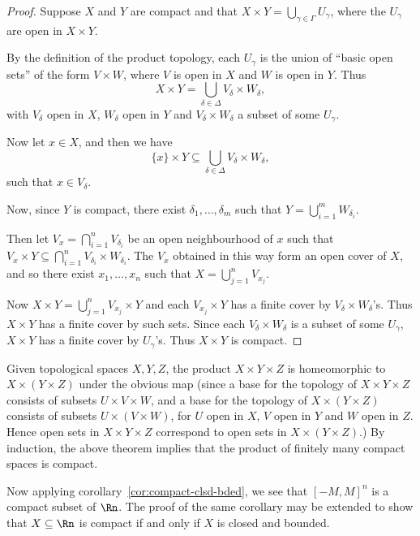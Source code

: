 \begin{proof}
	Suppose $X$ and $Y$ are compact and that $X\times Y=\bigcup_{\gamma\in\Gamma} U_\gamma$, where the $U_\gamma$ are open in $X\times Y$.

	By the definition of the product topology, each $U_\gamma$ is the union of ``basic open sets'' of the form $V \times W$, where $V$ is open in $X$ and $W$ is open in $Y$. Thus
	\begin{equation*}
		X\times Y=\bigcup_{\delta\in\Delta} V_\delta \times W_\delta,
	\end{equation*}
	with $V_\delta$ open in $X$, $W_\delta$ open in $Y$ and $V_\delta \times W_\delta$ a subset of some $U_\gamma$.

	Now let $x\in X$, and then we have
	\begin{equation*}
		\{x\} \times Y \subseteq \bigcup_{\delta\in\Delta} V_\delta \times W_\delta,
	\end{equation*}
	such that $x\in V_\delta$.

	Now, since $Y$ is compact, there exist $\delta_1,\ldots,\delta_m$ such that $Y=\bigcup_{i=1}^m W_{\delta_i}$.

	Then let $V_x = \bigcap_{i=1}^n V_{\delta_i}$ be an open neighbourhood of $x$ such that $V_x \times Y \subseteq \bigcap_{i=1}^n V_{\delta_i} \times W_{\delta_i}$. The $V_x$ obtained in this way form an open cover of $X$, and so there exist $x_1,\ldots,x_n$ such that $X = \bigcup_{j=1}^n V_{x_j}$.

	Now $X\times Y=\bigcup_{j=1}^n V_{x_j} \times Y$ and each $V_{x_j} \times Y$ has a finite cover by $V_\delta\times W_\delta$'s. Thus $X\times Y$ has a finite cover by such sets. Since each $V_\delta\times W_\delta$ is a subset of some $U_\gamma$, $X\times Y$ has a finite cover by $U_\gamma$'s. Thus $X\times Y$ is compact.
\end{proof}

	\pagebreak

\begin{remarks}
	Given topological spaces $X,Y,Z$, the product $X\times Y \times Z$ is homeomorphic to $X \times \left( Y\times Z \right)$ under the obvious map (since a base for the topology of $X\times Y \times Z$ consists of subsets $U\times V \times W$, and a base for the topology of $X \times \left( Y\times Z \right)$ consists of subsets $U\times \left( V\times W \right)$, for $U$ open in $X$, $V$ open in $Y$ and $W$ open in $Z$. Hence open sets in $X \times Y \times Z$ correspond to open sets in $X\times \left( Y\times Z \right)$.) By induction, the above theorem implies that the product of finitely many compact spaces is compact.

	Now applying corollary~\ref{cor:compact-clsd-bded}, we see that $\left[ -M,M \right]^n$ is a compact subset of $\Rn$. The proof of the same corollary may be extended to show that $X\subseteq \Rn$ is compact if and only if $X$ is closed and bounded.
\end{remarks}

